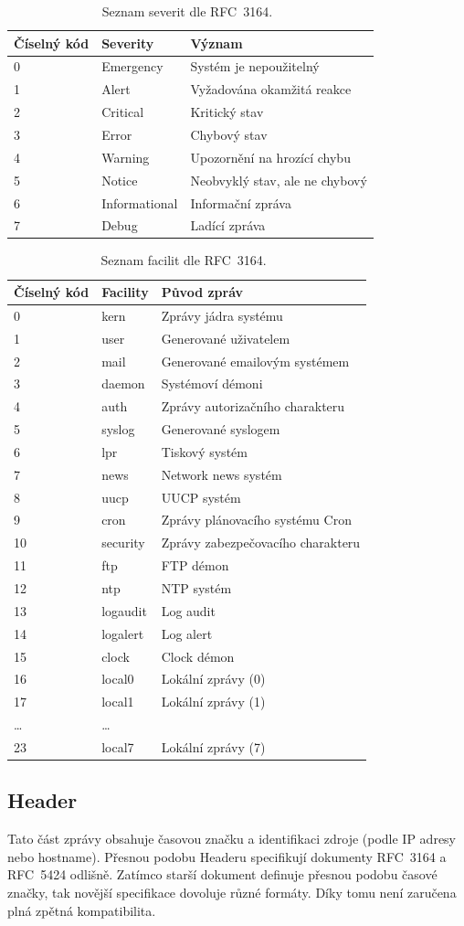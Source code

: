 \documentclass[thesis=B,czech]{FITthesis}[2012/06/26]
\begin{document}
\begin{table}[ht]
\centering
	\caption[Tabulka severit dle RFC~3164]{Seznam severit dle RFC~3164.~\cite{RFC3164}}
	\begin{tabular}{|l|l|l|}\hline
		Číselný kód	& Severity & Význam	\tabularnewline \hline \hline
		0		& Emergency	&	Systém je nepoužitelný \tabularnewline \hline
		1		& Alert		&	Vyžadována okamžitá reakce \tabularnewline \hline
		2		& Critical	&	Kritický stav \tabularnewline \hline
		3		& Error		&	Chybový stav	\tabularnewline \hline
		4		& Warning	&	Upozornění na hrozící chybu \tabularnewline \hline
		5		& Notice		&	Neobvyklý stav, ale ne chybový \tabularnewline \hline
		6		& Informational & Informační zpráva \tabularnewline \hline
		7		& Debug		&	Ladící zpráva \tabularnewline \hline
	\end{tabular}
\end{table}

\begin{table}[ht]   %
\centering
	\caption[Tabulka facilit dle RFC~3164]{Seznam facilit dle RFC~3164.~\cite{RFC3164}}
	\begin{tabular}{|l|l|l|}\hline
		Číselný kód & Facility & Původ zpráv \tabularnewline \hline \hline
		0		& kern & Zprávy jádra systému	\tabularnewline \hline
		1		& user & Generované uživatelem	\tabularnewline \hline
		2		& mail & Generované emailovým systémem			\tabularnewline \hline
		3		& daemon & Systémoví démoni			\tabularnewline \hline
		4		& auth & Zprávy autorizačního charakteru		\tabularnewline \hline
		5		& syslog & Generované syslogem	\tabularnewline \hline
		6		& lpr & Tiskový systém		\tabularnewline \hline
		7		& news & Network news systém		\tabularnewline \hline
		8		& uucp & UUCP systém			\tabularnewline \hline
		9		& cron & Zprávy plánovacího systému Cron			\tabularnewline \hline
		10		& security & Zprávy zabezpečovacího charakteru	 \tabularnewline \hline
		11		& ftp & FTP démon				\tabularnewline \hline
		12		& ntp & NTP systém			\tabularnewline \hline
		13		& logaudit & Log audit				\tabularnewline \hline
		14		& logalert & Log alert				\tabularnewline \hline
		15		& clock & Clock démon			\tabularnewline \hline
		16		& local0 & Lokální zprávy (0)			\tabularnewline \hline
		17		& local1 & Lokální zprávy (1)			\tabularnewline \hline
		\ldots	& \ldots				\tabularnewline \hline
		23		& local7 & Lokální zprávy (7)			\tabularnewline \hline
	\end{tabular}
\end{table}

\subsection{Header}
Tato část zprávy obsahuje časovou značku a identifikaci zdroje (podle IP adresy nebo hostname). Přesnou podobu Headeru specifikují dokumenty RFC~3164 a RFC~5424 odlišně. Zatímco starší dokument definuje přesnou podobu časové značky, tak novější specifikace dovoluje různé formáty. Díky tomu není zaručena plná zpětná kompatibilita.
\end{document}
